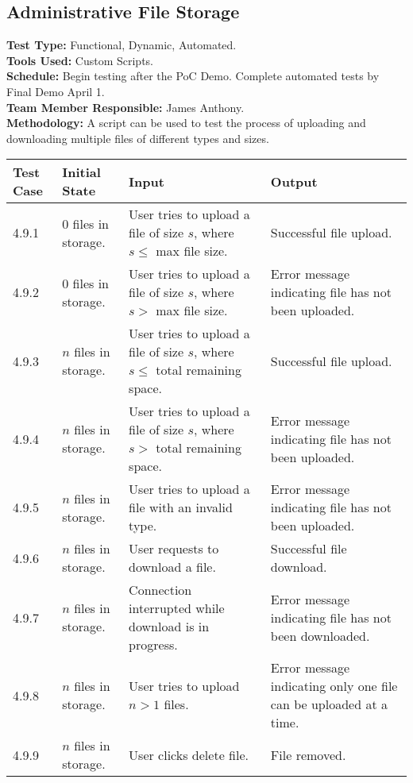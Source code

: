 \documentclass[12pt]{article}
\begin{document}
\subsection{Administrative File Storage}
\textbf{Test Type:} Functional, Dynamic, Automated. \\
\textbf{Tools Used:} Custom Scripts. \\
\textbf{Schedule:} Begin testing after the PoC Demo. Complete automated tests by Final Demo April 1. \\
\textbf{Team Member Responsible:} James Anthony. \\
\textbf{Methodology:} A script can be used to test the process of uploading and downloading multiple files of different types and sizes.

\begin{longtable}{|p{2cm}|p{3cm}|p{5cm}|p{5cm}|}
\hline
\textbf{Test Case} & \textbf{Initial State} & \textbf{Input} & \textbf{Output} \\ \hline
4.9.1 & 0 files in storage. & User tries to upload a file of size $s$, where $s \le$ max file size. & Successful file upload.\\
\hline
4.9.2 & 0 files in storage. & User tries to upload a file of size $s$, where $s >$ max file size. & Error message indicating file has not been uploaded.\\
\hline
4.9.3 & $n$ files in storage. & User tries to upload a file of size $s$, where $s \le$ total remaining space. & Successful file upload.\\
\hline
4.9.4 & $n$ files in storage. & User tries to upload a file of size $s$, where $s >$ total remaining space. & Error message indicating file has not been uploaded.\\
\hline
4.9.5 & $n$ files in storage. & User tries to upload a file with an invalid type. & Error message indicating file has not been uploaded.\\
\hline
4.9.6 & $n$ files in storage. & User requests to download a file. & Successful file download.\\
\hline
4.9.7 & $n$ files in storage. & Connection interrupted while download is in progress. & Error message indicating file has not been downloaded.\\
\hline
4.9.8 & $n$ files in storage. & User tries to upload  $n > 1$ files. & Error message indicating only one file can be uploaded at a time.\\
\hline
4.9.9 & $n$ files in storage. & User clicks delete file. & File removed. \\
\hline
\end{longtable}
\end{document}
